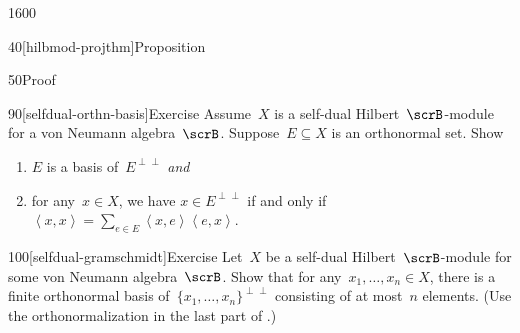 \begin{parsec}{1600}
\begin{point}{40}[hilbmod-projthm]{Proposition}
\begin{point}{50}{Proof}
\end{point}
\end{point}
\begin{point}{90}[selfdual-orthn-basis]{Exercise}%
Assume~$X$ is a self-dual Hilbert~$\scrB$-module for a von Neumann
    algebra~$\scrB$.
Suppose~$E \subseteq X$ is an orthonormal set. Show
\begin{enumerate}
\item
    $E$ is a basis of~$E^{\perp\perp}$ \emph{and}
\item
    for any~$x \in X$,
        we have
    $x \in E^{\perp\perp}$
    if and only if~$\left<x,x\right> = \sum_{e \in E} \left<x,e\right>
                \left<e,x\right>$.
\end{enumerate}
\spacingfix{}
\end{point}
\begin{point}{100}[selfdual-gramschmidt]{Exercise}%
Let~$X$ be a self-dual Hilbert~$\scrB$-module for some von Neumann
    algebra~$\scrB$.
Show that for any~$x_1, \ldots, x_n \in X$,
    there is a finite orthonormal basis
    of~$\{x_1, \ldots, x_n\}^{\perp\perp}$
    consisting of at most~$n$ elements.
(Use the orthonormalization in the last part of .)
\end{point}
\end{parsec}


